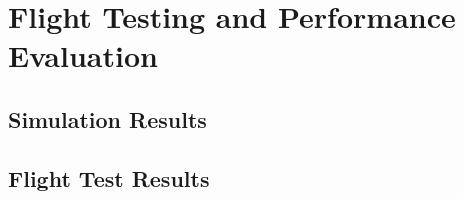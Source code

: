 \chapter{Flight Testing and Performance Evaluation}\label{ch:performance}

\section{Simulation Results}

\section{Flight Test Results}


